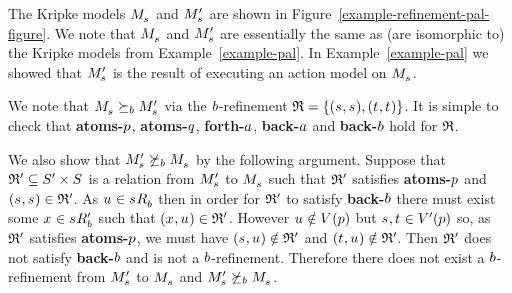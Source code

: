 \begin{example}
\begin{figure}
\end{figure}

The Kripke models $\kPModel{\kStateS}$ and $\kPModelP{\kStateS}$ are shown in Figure~\ref{example-refinement-pal-figure}.
We note that $\kPModel{\kStateS}$ and $\kPModelP{\kStateS}$ are essentially the same as (are isomorphic to) the Kripke models from Example~\ref{example-pal}.
In Example~\ref{example-pal} we showed that $\kPModelP{\kStateS}$ is the result of executing an action model on $\kPModel{\kStateS}$.

We note that $\kPModel{\kStateS} \simulatesB \kPModelP{\kStateS}$ via the $b$-refinement $\refinement = \{(\kStateS, \kStateS), (\kStateT, \kStateT)\}$.
It is simple to check that {\bf atoms-$p$}, {\bf atoms-$q$}, {\bf forth-$a$}, {\bf back-$a$} and {\bf back-$b$} hold for $\mathfrak{R}$.

We also show that $\kPModelP{\kStateS} \not\simulatesB \kPModel{\kStateS}$ by the following argument.
Suppose that $\refinement' \subseteq \kStatesP \times \kStates$ is a relation from $\kPModelP{\kStateS}$ to $\kPModel{\kStateS}$ such that $\mathfrak{R}'$ satisfies {\bf atoms-$p$} and $(\kStateS, \kStateS) \in \refinement'$.
As $\kStateU \in \kSuccessorsB{\kStateS}$ then in order for $\mathfrak{R}'$ to satisfy {\bf back-$b$} there must exist some $\kStateX \in \kSuccessorsPB{\kStateS}$ such that $(\kStateX, \kStateU) \in \refinement'$.
However $\kStateU \notin \kValuation(\atomP)$ but $\kStateS, \kStateT \in \kValuationP(\atomP)$ so, as $\mathfrak{R}'$ satisfies {\bf atoms-$p$}, we must have $(\kStateS, \kStateU) \notin \refinement'$ and $(\kStateT, \kStateU) \notin \refinement'$.
Then $\mathfrak{R}'$ does not satisfy {\bf back-$b$} and is not a $b$-refinement.
Therefore there does not exist a $b$-refinement from $\kPModelP{\kStateS}$ to $\kPModel{\kStateS}$ and $\kPModelP{\kStateS} \not\simulatesB \kPModel{\kStateS}$.
\end{example}

